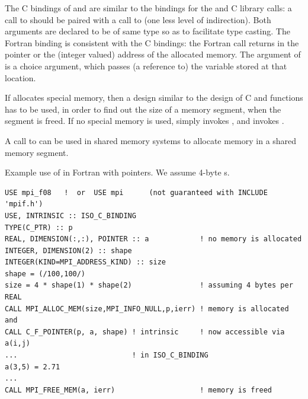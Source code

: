 \begin{rationale}
The C bindings of  and
 are similar to the bindings for the
 and  C library calls:
a call to
 should be paired with a call to
 (one less 
level of indirection). Both arguments are declared to
be of same type  so as to facilitate type casting.
The Fortran binding is consistent with the C bindings:
the Fortran  call returns in 
 the  pointer or
the (integer valued) address 
of the allocated memory.
The  argument of  is a choice
argument, which passes (a reference to) the variable stored at that location.
\end{rationale}

\begin{implementors}
If  allocates special memory, then
a design similar to the design of C  and 
functions has to
be used, in order to find out the size of a memory segment, when the segment is freed.
If no special memory is used,
 simply invokes , and  invokes .

A call to  can be used in shared memory
systems to allocate  memory in a shared memory segment.
\end{implementors}

\begin{example}
\label{ex:1side-fmalloc-ptr}
%
Example use of  in Fortran with
 pointers. We assume 4-byte s.
\begin{lstlisting}[language={[MPI08]Fortran},basicstyle=\lstsmall]
USE mpi_f08   !  or  USE mpi      (not guaranteed with INCLUDE 'mpif.h')
USE, INTRINSIC :: ISO_C_BINDING
TYPE(C_PTR) :: p
REAL, DIMENSION(:,:), POINTER :: a            ! no memory is allocated
INTEGER, DIMENSION(2) :: shape
INTEGER(KIND=MPI_ADDRESS_KIND) :: size
shape = (/100,100/)
size = 4 * shape(1) * shape(2)                ! assuming 4 bytes per REAL
CALL MPI_ALLOC_MEM(size,MPI_INFO_NULL,p,ierr) ! memory is allocated and
CALL C_F_POINTER(p, a, shape) ! intrinsic     ! now accessible via a(i,j)
...                           ! in ISO_C_BINDING
a(3,5) = 2.71
...
CALL MPI_FREE_MEM(a, ierr)                    ! memory is freed
\end{lstlisting}
\end{example}


